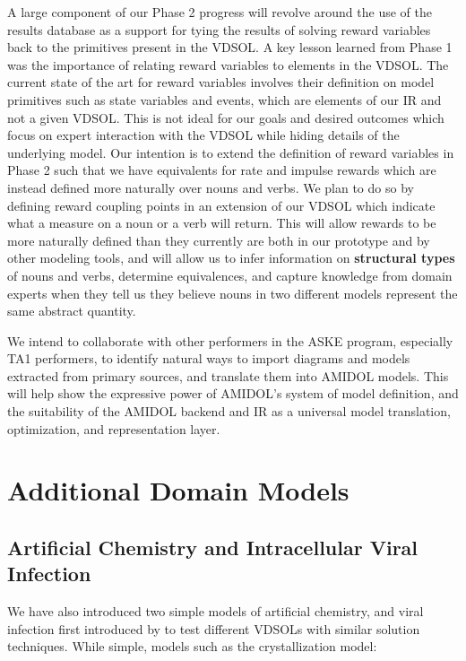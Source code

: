 \documentclass[11pt]{article}
\newcommand{\amidol}{\textsc{AMIDOL}}
\begin{document}
A large component of our Phase 2 progress will revolve around the use of the results database as a support for tying the results of solving reward variables back to the primitives present in the VDSOL.  A key lesson learned from Phase 1 was the importance of relating reward variables to elements in the VDSOL.  The current state of the art for reward variables involves their definition on model primitives such as state variables and events, which are elements of our IR and not a given VDSOL.  This is not ideal for our goals and desired outcomes which focus on expert interaction with the VDSOL while hiding details of the underlying model.  Our intention is to extend the definition of reward variables in Phase 2 such that we have equivalents for rate and impulse rewards which are instead defined more naturally over nouns and verbs.  We plan to do so by defining reward coupling points in an extension of our VDSOL which indicate what a measure on a noun or a verb will return.  This will allow rewards to be more naturally defined than they currently are both in our prototype and by other modeling tools, and will allow us to infer information on \textbf{structural types} of nouns and verbs, determine equivalences, and capture knowledge from domain experts when they tell us they believe nouns in two different models represent the same abstract quantity.

We intend to collaborate with other performers in the ASKE program, especially TA1 performers, to identify natural ways to import diagrams and models extracted from primary sources, and translate them into \amidol{} models.  This will help show the expressive power of \amidol{}'s system of model definition, and the suitability of the \amidol{} backend and IR as a universal model translation, optimization, and representation layer.



\appendix
\section{Additional Domain Models}

\subsection{Artificial Chemistry and Intracellular Viral Infection}

We have also introduced two simple models of artificial chemistry, and viral infection first introduced by \cite{srivastava2002stochastic,haseltine2002approximate} to test different VDSOLs with similar solution techniques.  While simple, models such as the crystallization model:
\end{document}
